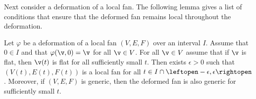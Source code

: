 Next consider a deformation of a local fan.  The following lemma
gives a list of conditions that ensure that the deformed fan remains
local throughout the deformation.


\begin{lemma}[]\label{lemma:fan-open}
Let $\varphi$ be a deformation of a local fan $(V,E,F)$ over an
interval $I$.  Assume that $0\in I$ and that $\varphi(\v,0)=\v$ for
all $\v\in V$.  For all $\v\in V$ assume that if
$\v$ is flat, then $\v(t)$ is flat for all sufficiently small $t$.
Then exists $\epsilon>0$ such that $(V(t),E(t),F(t))$ is a local fan
for all $t\in I\cap \leftopen-\epsilon,\epsilon\rightopen$.  
Moreover,  if $(V,E,F)$ is
generic, then the deformed fan is also generic for sufficiently small
$t$.
\end{lemma}

